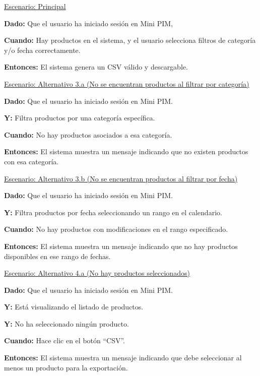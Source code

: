 
\underline{Escenario: Principal}\par
\textbf{Dado:} Que el usuario ha iniciado sesión en Mini PIM, \par
\textbf{Cuando:} Hay productos en el sistema, y el usuario selecciona filtros de categoría y/o fecha correctamente.\par
\textbf{Entonces:} El sistema genera un CSV válido y descargable.\par
\vspace{0.15cm}
\underline{Escenario: Alternativo 3.a (No se encuentran productos al filtrar por categoría)}\par
\textbf{Dado:} Que el usuario ha iniciado sesión en Mini PIM.  \par
\textbf{Y:} Filtra productos por una categoría específica. \par 
\textbf{Cuando:} No hay productos asociados a esa categoría. \par 
\textbf{Entonces:} El sistema muestra un mensaje indicando que no existen productos con esa categoría.\par
\vspace{0.15cm}
\underline{Escenario: Alternativo 3.b (No se encuentran productos al filtrar por fecha)}\par
\textbf{Dado:} Que el usuario ha iniciado sesión en Mini PIM.  \par
\textbf{Y:} Filtra productos por fecha seleccionando un rango en el calendario.\par  
\textbf{Cuando:} No hay productos con modificaciones en el rango especificado.  \par
\textbf{Entonces:} El sistema muestra un mensaje indicando que no hay productos disponibles en ese rango de fechas.\par
\vspace{0.15cm}
\underline{Escenario: Alternativo 4.a (No hay productos seleccionados)}\par
\textbf{Dado:} Que el usuario ha iniciado sesión en Mini PIM.  \par
\textbf{Y:} Está visualizando el listado de productos.  \par
\textbf{Y:} No ha seleccionado ningún producto.  \par
\textbf{Cuando:} Hace clic en el botón \enquote{CSV}.  \par
\textbf{Entonces:} El sistema muestra un mensaje indicando que debe seleccionar al menos un producto para la exportación.\par
